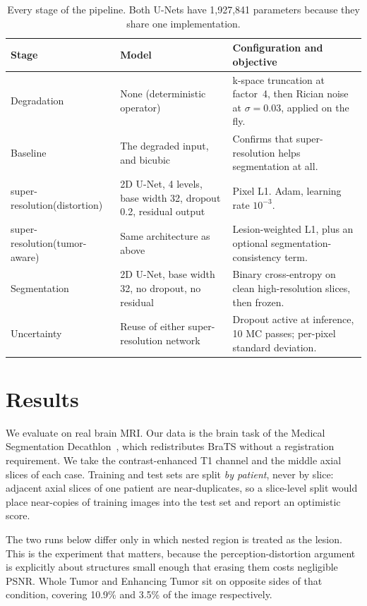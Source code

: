 \documentclass[11pt,a4paper]{article}
\newcommand{\SR}{super-resolution\xspace}
\begin{document}
\begin{table}[h]
  \caption{Every stage of the pipeline. Both U-Nets have 1{,}927{,}841 parameters because they share one implementation.}
  \label{tab:stages}
  \centering\small
  \renewcommand{\arraystretch}{1.2}
  \begin{tabular}{@{}>{\raggedright\arraybackslash}p{2.5cm}>{\raggedright\arraybackslash}p{4.3cm}>{\raggedright\arraybackslash}p{6.4cm}@{}}
    \toprule
    \textbf{Stage} & \textbf{Model} & \textbf{Configuration and objective} \\
    \midrule
    Degradation & None (deterministic operator) & k-space truncation at factor~4, then Rician noise at $\sigma = 0.03$, applied on the fly. \\
    Baseline & The degraded input, and bicubic & Confirms that \SR helps segmentation at all. \\
    \SR (distortion) & 2D U-Net, 4 levels, base width 32, dropout 0.2, residual output & Pixel L1. Adam, learning rate $10^{-3}$. \\
    \SR (tumor-aware) & Same architecture as above & Lesion-weighted L1, plus an optional segmentation-consistency term. \\
    Segmentation & 2D U-Net, base width 32, no dropout, no residual & Binary cross-entropy on clean high-resolution slices, then frozen. \\
    Uncertainty & Reuse of either \SR network & Dropout active at inference, 10 MC passes; per-pixel standard deviation. \\
    \bottomrule
  \end{tabular}
\end{table}

\section{Results}

We evaluate on real brain MRI. Our data is the brain task of the Medical Segmentation Decathlon~\cite{antonelli2022}, which redistributes BraTS without a registration requirement. We take the contrast-enhanced T1 channel and the middle axial slices of each case. Training and test sets are split \emph{by patient}, never by slice: adjacent axial slices of one patient are near-duplicates, so a slice-level split would place near-copies of training images into the test set and report an optimistic score.

The two runs below differ only in which nested region is treated as the lesion. This is the experiment that matters, because the perception-distortion argument is explicitly about structures small enough that erasing them costs negligible PSNR. Whole Tumor and Enhancing Tumor sit on opposite sides of that condition, covering 10.9\% and 3.5\% of the image respectively.
\end{document}
